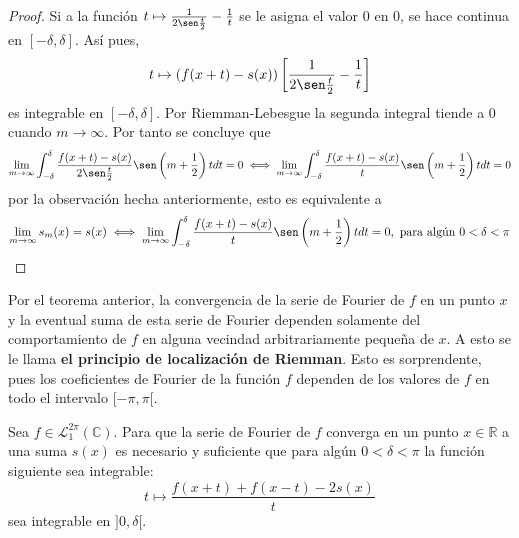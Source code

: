 \documentclass[12pt]{report}
\newcounter{it}
\theoremstyle{largebreak}
\begin{document}
\begin{proof}
        Si a la función $t\mapsto\frac{1}{2\sen\frac{t}{2}}-\frac{1}{t}$ se le asigna el valor 0 en 0, se hace continua en $[-\delta,\delta]$. Así pues,
        \begin{equation*}
            t\mapsto\left(f(x+t)-s(x) \right)\left[\frac{1}{2\sen\frac{t}{2}}-\frac{1}{t}\right]
        \end{equation*}
        es integrable en $[-\delta,\delta]$. Por Riemman-Lebesgue la segunda integral tiende a 0 cuando $m\rightarrow\infty$. Por tanto se concluye que
        \begin{equation*}
            \lim_{ m\rightarrow\infty}\int_{-\delta}^{\delta}\frac{f(x+t)-s(x)}{2\sen\frac{t}{2}}\sen\left(m+\frac{1}{2} \right)tdt=0\iff\lim_{ m\rightarrow\infty}\int_{-\delta}^{\delta}\frac{f(x+t)-s(x)}{t}\sen\left(m+\frac{1}{2} \right)tdt=0
        \end{equation*}
        por la observación hecha anteriormente, esto es equivalente a
        \begin{equation*}
            \lim_{ m\rightarrow\infty}s_m(x)=s(x)\iff\lim_{ m\rightarrow\infty}\int_{-\delta}^{\delta}\frac{f(x+t)-s(x)}{t}\sen\left(m+\frac{1}{2} \right)tdt=0,\textup{ para algún }0<\delta<\pi
        \end{equation*}
    \end{proof}

    \begin{obs}
        Por el teorema anterior, la convergencia de la serie de Fourier de $f$ en un punto $x$ y la eventual suma de esta serie de Fourier dependen solamente del comportamiento de $f$ en alguna vecindad arbitrariamente pequeña de $x$. A esto se le llama \textbf{el principio de localización de Riemman}. Esto es sorprendente, pues los coeficientes de Fourier de la función $f$ dependen de los valores de $f$ en todo el intervalo $[-\pi,\pi[$.
    \end{obs}

    \begin{theor}
        Sea $f\in\mathcal{L}_1^{2\pi}(\mathbb{C})$. Para que la serie de Fourier de $f$ converga en un punto $x\in\mathbb{R}$ a una suma $s(x)$ es necesario y suficiente que para algún $0<\delta<\pi$ la función siguiente sea integrable:
        \begin{equation*}
            t\mapsto\frac{f(x+t)+f(x-t)-2s(x)}{t}
        \end{equation*}
        sea integrable en $]0,\delta[$.
    \end{theor}
\end{document}

